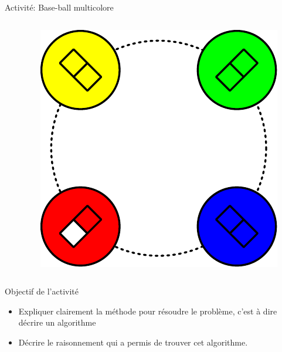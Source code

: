 \begin{frame}{Activité: Base-ball multicolore}
\begin{columns}
\begin{column}{0.27\linewidth}
    \end{column}
    \begin{column}{0.27\linewidth}
    \includegraphics[width=\linewidth]{img/baseball_final.pdf}\\
    \end{column}
  \end{columns}

  \bigskip
  \begin{block}{Objectif de l'activité}
    \begin{itemize}
      \item Expliquer clairement la méthode pour résoudre le problème, c'est à dire décrire un \alert{algorithme}
      \item Décrire le raisonnement qui a permis de trouver cet algorithme.
    \end{itemize}
  \end{block}
\end{frame}

